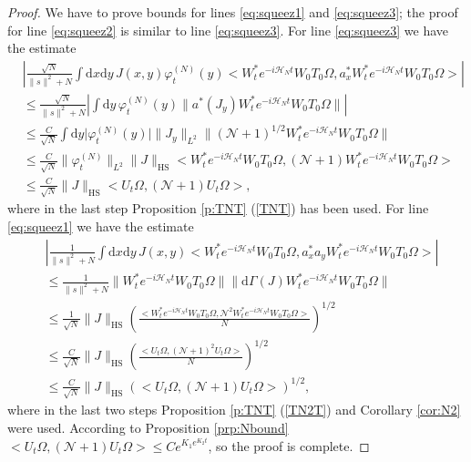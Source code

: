 \documentclass[11pt,a4paper,draft,DIV11]{scrartcl}	%
\newcommand{\di}{\textrm{d}}		%
\newcommand{\Ncal}{\mathcal{N}}		%
\newcommand{\Hcal}{\mathcal{H}}		%
\newcommand{\scal}[2]{\big<#1,#2\big>} %
\newcommand{\norm}[1]{\lVert#1\rVert}	%
\newcommand{\ph}{\varphi_t^{(N)}}	%
\newcommand{\HS}{_{\textrm{HS}}}
\begin{document}
\begin{proof}
We have to prove bounds for lines \eqref{eq:squeez1} and \eqref{eq:squeez3}; the proof for line \eqref{eq:squeez2} is similar to line \eqref{eq:squeez3}.
For line \eqref{eq:squeez3} we have the estimate
\begin{align*}
& \left\lvert \frac{\sqrt{N}}{\norm{s}^2+N} \int \di x\di y\, J(x,y) \ph(y) \scal{W^\ast_t e^{-i\Hcal_N t}W_0 T_0 \Omega}{a^\ast_x W^\ast_t e^{-i\Hcal_N t}W_0 T_0 \Omega}  \right\rvert \\
& \leq \frac{\sqrt{N}}{\norm{s}^2+N}\left\lvert \int \di y\, \ph(y) \norm{a^\ast(J_y)W^\ast_t e^{-i\Hcal_N t} W_0 T_0 \Omega} \right\rvert\\
& \leq \frac{C}{\sqrt{N}} \int \di y \lvert \ph(y)\rvert \norm{J_y}_{L^2} \norm{(\Ncal+1)^{1/2} W^\ast_t e^{-i\Hcal_N t}W_0 T_0 \Omega} \\
& \leq \frac{C}{\sqrt{N}} \norm{\ph}_{L^2} \norm{J}\HS \scal{W^\ast_t e^{-i\Hcal_N t}W_0 T_0 \Omega}{(\Ncal+1)W^\ast_t e^{-i\Hcal_N t}W_0 T_0 \Omega} \\
& \leq \frac{C}{\sqrt{N}} \norm{J}\HS \scal{U_t \Omega}{(\Ncal+1)U_t \Omega},
\end{align*}
where in the last step Proposition \ref{p:TNT} (\ref{TNT}) has been used.
For line \eqref{eq:squeez1} we have the estimate
\begin{align*}
& \left\lvert \frac{1}{\norm{s}^2+N} \int \di x\di y\, J(x,y) \scal{W^\ast_t e^{-i\Hcal_N t}W_0 T_0 \Omega}{a^\ast_x a_y W^\ast_t e^{-i\Hcal_N t}W_0 T_0 \Omega} \right \rvert \\
& \leq \frac{1}{\norm{s}^2+N} \norm{W^\ast_t e^{-i\Hcal_N t}W_0 T_0 \Omega}\norm{\di\Gamma(J) W^\ast_t e^{-i\Hcal_N t}W_0 T_0 \Omega} \\
& \leq \frac{1}{\sqrt{N}} \norm{J}\HS \left( \frac{\scal{W^\ast_t e^{-i\Hcal_N t}W_0 T_0 \Omega}{\Ncal^2 W^\ast_t e^{-i\Hcal_N t}W_0 T_0 \Omega}}{N} \right)^{1/2} \\
& \leq \frac{C}{\sqrt{N}} \norm{J}\HS \left( \frac{\scal{U_t \Omega}{(\Ncal+1)^2 U_t \Omega}}{N} \right)^{1/2} \\
& \leq \frac{C}{\sqrt{N}} \norm{J}\HS \left( \scal{U_t \Omega}{(\Ncal+1) U_t \Omega} \right)^{1/2},
\end{align*}
where in the last two steps Proposition \ref{p:TNT} (\ref{TN2T}) and Corollary \ref{cor:N2} were used.
According to Proposition \ref{prp:Nbound} $\scal{U_t \Omega}{\left(\Ncal + 1\right) U_t \Omega} \leq C e^{K_1 e^{K_2 t}}$, so the proof is complete.
\end{proof}
\end{document}
